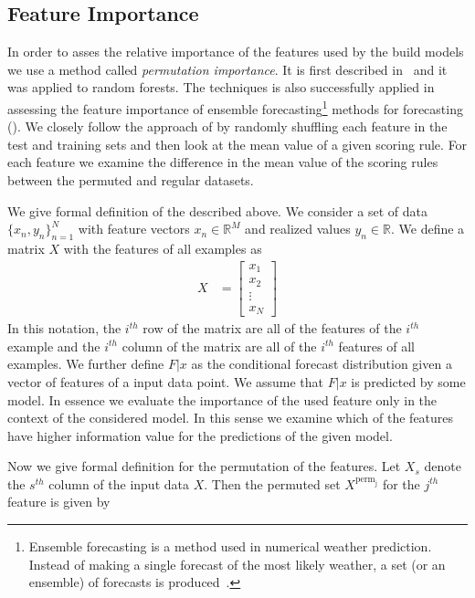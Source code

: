 \documentclass[12pt,a4paper,twoside]{scrartcl}
\numberwithin{equation}{section}
\begin{document}
\subsection{Feature Importance}\label{sec:feature-importance}
In order to asses the relative importance of the features used by the build models we use a method called \emph{permutation importance}. It is first described in~\cite{breiman2001} and it was applied to random forests. The techniques is also successfully applied in assessing the feature importance of ensemble forecasting\footnote{Ensemble forecasting is a method used in numerical weather prediction. Instead of making a single forecast of the most likely weather, a set (or an ensemble) of forecasts is produced~\cite{ensemble}.} methods for forecasting (\cite{lerch2018}). We closely follow the approach of \cite{lerch2018} by randomly shuffling each feature in the test and training sets and then look at the mean value of a given scoring rule. For each feature we examine the difference in the mean value of the scoring rules between the permuted and regular datasets.

We give formal definition of the described above. We consider a set of data \(\{x_n, y_n\}_{n=1}^N\) with feature vectors \(x_n\in\mathbb{R}^M\) and realized values \(y_n\in\mathbb{R}\). We define a matrix \(X\) with the features of all examples as
\begin{align}
  X &= \begin{bmatrix}
    x_{1} \\
    x_{2} \\
    \vdots \\
    x_{N}
  \end{bmatrix}
\end{align}
In this notation, the \(i^{th}\) row of the matrix are all of the features of the \(i^{th}\) example and the \(i^{th}\) column of the matrix are all of the \(i^{th}\) features of all examples. We further define \(F|x\) as the conditional forecast distribution given a vector of features of a input data point. We assume that \(F|x\) is predicted by some model. In essence we evaluate the importance of the used feature only in the context of the considered model. In this sense we examine which of the features have higher information value for the predictions of the given model.

Now we give formal definition for the permutation of the features. Let \(X_s\) denote the \(s^{th}\) column of the input data \(X\). Then the permuted set \(X^{\text{perm}_{\text{j}}}\) for the \(j^{th}\) feature is given by
\end{document}
